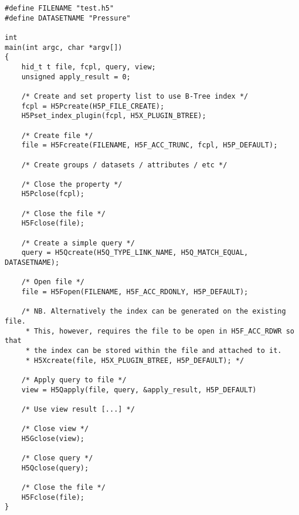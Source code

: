 {
\begin{lstlisting}
#define FILENAME "test.h5"
#define DATASETNAME "Pressure"

int
main(int argc, char *argv[])
{
    hid_t t file, fcpl, query, view;
    unsigned apply_result = 0;

    /* Create and set property list to use B-Tree index */
    fcpl = H5Pcreate(H5P_FILE_CREATE);
    H5Pset_index_plugin(fcpl, H5X_PLUGIN_BTREE);

    /* Create file */
    file = H5Fcreate(FILENAME, H5F_ACC_TRUNC, fcpl, H5P_DEFAULT);

    /* Create groups / datasets / attributes / etc */

    /* Close the property */
    H5Pclose(fcpl);

    /* Close the file */
    H5Fclose(file);

    /* Create a simple query */
    query = H5Qcreate(H5Q_TYPE_LINK_NAME, H5Q_MATCH_EQUAL, DATASETNAME);

    /* Open file */
    file = H5Fopen(FILENAME, H5F_ACC_RDONLY, H5P_DEFAULT);

    /* NB. Alternatively the index can be generated on the existing file.
     * This, however, requires the file to be open in H5F_ACC_RDWR so that
     * the index can be stored within the file and attached to it.
     * H5Xcreate(file, H5X_PLUGIN_BTREE, H5P_DEFAULT); */

    /* Apply query to file */
    view = H5Qapply(file, query, &apply_result, H5P_DEFAULT)

    /* Use view result [...] */

    /* Close view */
    H5Gclose(view);

    /* Close query */
    H5Qclose(query);

    /* Close the file */
    H5Fclose(file);
}
\end{lstlisting}
}


